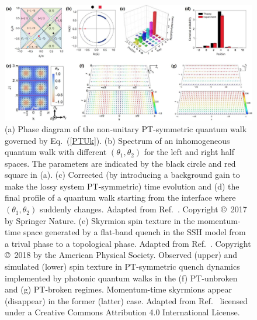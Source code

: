 \documentclass{tADP2e}
\theoremstyle{plain}
\theoremstyle{plain}
\theoremstyle{definition}
\begin{document}
\begin{figure}[!t]
\begin{center}
\includegraphics[width=14.5cm]{./Figures/fig_6_dyn.pdf}
\end{center}
\caption{(a) Phase diagram of the non-unitary PT-symmetric quantum walk governed by Eq.~(\ref{PTUk}). (b) Spectrum of an inhomogeneous quantum walk with different $(\theta_1,\theta_2)$ for the left and right half spaces. The parameters are indicated by the black circle and red square in (a). (c) Corrected (by introducing a background gain to make the lossy system PT-symmetric) time evolution and (d) the final profile of a quantum walk starting from the interface where $(\theta_1,\theta_2)$ suddenly changes. Adapted from Ref.~\cite{LX17}. Copyright \copyright\, 2017 by Springer Nature. (e) Skyrmion spin texture in the momentum-time space generated by a flat-band quench in the SSH model from a trival phase to a topological phase. Adapted from Ref.~\cite{GZ18}. Copyright \copyright\, 2018 by the American Physical Society. Observed (upper) and simulated (lower) spin texture in PT-symmetric quench dynamics implemented by photonic quantum walks in the (f) PT-unbroken and (g) PT-broken regimes. Momentum-time skyrmions appear (disappear) in the former (latter) case. Adapted from Ref.~\cite{KW19} licensed under a Creative Commons Attribution 4.0 International License.}
\label{fig:dyn}
\end{figure}
\end{document}
